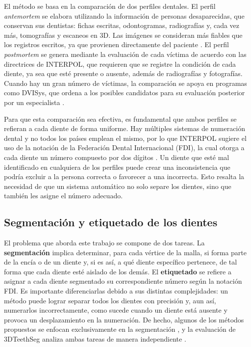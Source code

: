 El método se basa en la comparación de dos perfiles dentales. El perfil \textit{antemortem} se elabora utilizando la información de personas desaparecidas, que conservan sus dentistas: 
fichas escritas, odontogramas, radiografías y, cada vez más, tomografías y escaneos en 3D. Las imágenes se consideran más fiables que los registros escritos, ya que 
provienen directamente del paciente \cite{forrestForensicOdontologyDVI2019}. El perfil \textit{postmortem} se genera mediante la evaluación de cada víctima de acuerdo con las directrices 
de INTERPOL, que requieren que se registre la condición de cada diente, ya sea que esté presente o ausente, además de radiografías y fotografías. Cuando hay un gran número de víctimas,
la comparación se apoya en programas como DVISys, que ordena a los posibles candidatos para su evaluación posterior por un especialista \cite{forrestForensicOdontologyDVI2019}.

Para que esta comparación sea efectiva, es fundamental que ambos perfiles se refieran a cada diente de forma uniforme. Hay múltiples sistemas de numeración dental y no todos los países
emplean el mismo, por lo que INTERPOL sugiere el uso de la notación de la Federación Dental Internacional (FDI), la cual otorga a cada diente un número compuesto por dos dígitos
\cite{forrestForensicOdontologyDVI2019}. Un diente que esté mal identificado en cualquiera de los perfiles puede crear una inconsistencia que podría excluir a la persona correcta o
favorecer a una incorrecta. Esto resalta la necesidad de que un sistema automático no solo separe los dientes, sino que también les asigne el número adecuado.

\subsection{Segmentación y etiquetado de los dientes}
\label{subsec:segmentacion-etiquetado}

El problema que aborda este trabajo se compone de dos tareas. La \textbf{segmentación} implica determinar, para cada vértice de la malla, si forma parte de la encía o de un diente y, si es así,
a qué diente específico pertenece, de tal forma que cada diente esté aislado de los demás. El \textbf{etiquetado} se refiere a asignar a cada diente segmentado su correspondiente número
según la notación FDI. Es importante diferenciarlas debido a sus distintas complejidades: un método puede lograr separar todos los dientes con precisión y, aun así, numerarlos
incorrectamente, como sucede cuando un diente está ausente y provoca un desplazamiento en la numeración. De hecho, algunos de los métodos propuestos se enfocan exclusivamente en la
segmentación \cite{qiuDArchDentalArch2022}, y la evaluación de 3DTeethSeg analiza ambas tareas de manera independiente \cite{ben-hamadou3DTeethSeg223DTeeth2023}.


